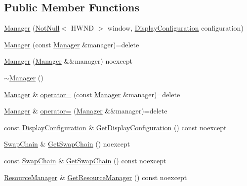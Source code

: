 \subsection*{Public Member Functions}
\begin{DoxyCompactItemize}
\item 
\hyperlink{classmage_1_1rendering_1_1_manager_acf71efbc73317b319be41682505695f1}{Manager} (\hyperlink{namespacemage_a8769f9d670d6b585ea306cb1062af94b}{Not\+Null}$<$ H\+W\+ND $>$ window, \hyperlink{classmage_1_1rendering_1_1_display_configuration}{Display\+Configuration} configuration)
\item 
\hyperlink{classmage_1_1rendering_1_1_manager_a85b0881e007cf5ad3646de67c21a0312}{Manager} (const \hyperlink{classmage_1_1rendering_1_1_manager}{Manager} \&manager)=delete
\item 
\hyperlink{classmage_1_1rendering_1_1_manager_a23fc23a973ca28176f950c750be2d27a}{Manager} (\hyperlink{classmage_1_1rendering_1_1_manager}{Manager} \&\&manager) noexcept
\item 
\hyperlink{classmage_1_1rendering_1_1_manager_a9b43ab8313e441faadb60863759bbc46}{$\sim$\+Manager} ()
\item 
\hyperlink{classmage_1_1rendering_1_1_manager}{Manager} \& \hyperlink{classmage_1_1rendering_1_1_manager_acbc8c70a805b9f82268dd0391aa96e44}{operator=} (const \hyperlink{classmage_1_1rendering_1_1_manager}{Manager} \&manager)=delete
\item 
\hyperlink{classmage_1_1rendering_1_1_manager}{Manager} \& \hyperlink{classmage_1_1rendering_1_1_manager_abd824b25445bd67bfbddb49961796f28}{operator=} (\hyperlink{classmage_1_1rendering_1_1_manager}{Manager} \&\&manager)=delete
\item 
const \hyperlink{classmage_1_1rendering_1_1_display_configuration}{Display\+Configuration} \& \hyperlink{classmage_1_1rendering_1_1_manager_ac316fed528d23c8234dc3457beb3ed33}{Get\+Display\+Configuration} () const noexcept
\item 
\hyperlink{classmage_1_1rendering_1_1_swap_chain}{Swap\+Chain} \& \hyperlink{classmage_1_1rendering_1_1_manager_a3cfc594583bb0c762375a1283d263fd1}{Get\+Swap\+Chain} () noexcept
\item 
const \hyperlink{classmage_1_1rendering_1_1_swap_chain}{Swap\+Chain} \& \hyperlink{classmage_1_1rendering_1_1_manager_a219939c5316dd348822e39c89141d429}{Get\+Swap\+Chain} () const noexcept
\item 
\hyperlink{classmage_1_1rendering_1_1_resource_manager}{Resource\+Manager} \& \hyperlink{classmage_1_1rendering_1_1_manager_a9f696201405be6ebcd3805184535cefe}{Get\+Resource\+Manager} () const noexcept

\end{DoxyCompactItemize}
